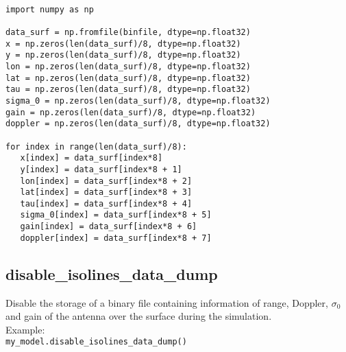 \verb|   |\\
\verb|import numpy as np|\\
\verb|   |\\
\verb|data_surf = np.fromfile(binfile, dtype=np.float32)|\\
\verb|x = np.zeros(len(data_surf)/8, dtype=np.float32)|\\
\verb|y = np.zeros(len(data_surf)/8, dtype=np.float32)|\\
\verb|lon = np.zeros(len(data_surf)/8, dtype=np.float32)|\\
\verb|lat = np.zeros(len(data_surf)/8, dtype=np.float32)|\\
\verb|tau = np.zeros(len(data_surf)/8, dtype=np.float32)|\\
\verb|sigma_0 = np.zeros(len(data_surf)/8, dtype=np.float32)|\\
\verb|gain = np.zeros(len(data_surf)/8, dtype=np.float32)|\\
\verb|doppler = np.zeros(len(data_surf)/8, dtype=np.float32)|\\
\verb|   |\\
\verb|for index in range(len(data_surf)/8):|\\
\verb|   x[index] = data_surf[index*8]|\\
\verb|   y[index] = data_surf[index*8 + 1]|\\
\verb|   lon[index] = data_surf[index*8 + 2]|\\
\verb|   lat[index] = data_surf[index*8 + 3]|\\
\verb|   tau[index] = data_surf[index*8 + 4]|\\
\verb|   sigma_0[index] = data_surf[index*8 + 5]|\\
\verb|   gain[index] = data_surf[index*8 + 6]|\\
\verb|   doppler[index] = data_surf[index*8 + 7]|\\


\subsection{disable\_isolines\_data\_dump}

Disable the storage of a binary file containing information of range, Doppler, $\sigma_0$ and gain of the antenna over the surface during the simulation.\\

Example:\\

\texttt{my\_model.disable\_isolines\_data\_dump()}\\


